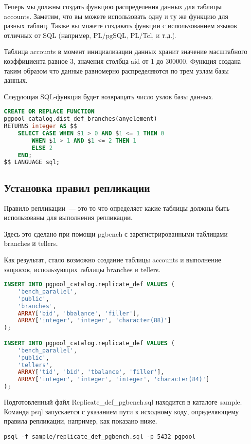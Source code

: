 Теперь мы должны создать функцию распределения данных для таблицы accounts. Заметим, что вы можете использовать
одну и ту же функцию для разных таблиц. Также вы можете создавать функции с использованием языков отличных от SQL
(например, PL/pgSQL, PL/Tcl, и т.д.).

Таблица accounts в момент инициализации данных хранит значение масштабного коэффициента равное 3, значения
столбца aid от 1 до 300000. Функция создана таким образом что данные равномерно распределяются по трем узлам базы данных.

Следующая SQL-функция будет возвращать число узлов базы данных.
\begin{lstlisting}[language=SQL,label=lst:pgpool34,caption=Установка правил распределения данных]
CREATE OR REPLACE FUNCTION
pgpool_catalog.dist_def_branches(anyelement)
RETURNS integer AS $$
    SELECT CASE WHEN $1 > 0 AND $1 <= 1 THEN 0
        WHEN $1 > 1 AND $1 <= 2 THEN 1
        ELSE 2
    END;
$$ LANGUAGE sql;
\end{lstlisting}

\subsection{Установка правил репликации}
Правило репликации~--- это то что определяет какие таблицы должны быть использованы для выполнения репликации.

Здесь это сделано при помощи pgbench с зарегистрированными таблицами branches и tellers.

Как результат, стало возможно создание таблицы accounts и выполнение запросов, использующих таблицы branches и tellers.
\begin{lstlisting}[language=SQL,label=lst:pgpool35,caption=Установка правил репликации]
INSERT INTO pgpool_catalog.replicate_def VALUES (
    'bench_parallel',
    'public',
    'branches',
    ARRAY['bid', 'bbalance', 'filler'],
    ARRAY['integer', 'integer', 'character(88)']
);

INSERT INTO pgpool_catalog.replicate_def VALUES (
    'bench_parallel',
    'public',
    'tellers',
    ARRAY['tid', 'bid', 'tbalance', 'filler'],
    ARRAY['integer', 'integer', 'integer', 'character(84)']
);
\end{lstlisting}

Подготовленный файл Replicate\_def\_pgbench.sql находится в каталоге sample. Команда psql запускается с указанием пути к
исходному коду, определяющему правила репликации, например, как показано ниже.
\begin{lstlisting}[label=lst:pgpool36,caption=Установка правил репликации]
psql -f sample/replicate_def_pgbench.sql -p 5432 pgpool
\end{lstlisting}

